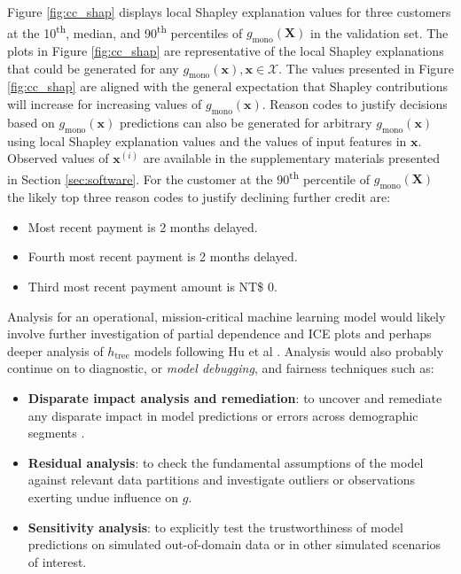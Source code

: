 \documentclass[sigconf, review]{acmart}
\begin{document}
Figure \ref{fig:cc_shap} displays local Shapley explanation values for three customers at the 10\textsuperscript{th}, median, and 90\textsuperscript{th} percentiles of $g_{\text{mono}}(\mathbf{X})$ in the validation set. The plots in Figure \ref{fig:cc_shap} are representative of the local Shapley explanations that could be generated for any $g_{\text{mono}}(\mathbf{x}), \mathbf{x} \in \mathcal{X}$. The values presented in Figure \ref{fig:cc_shap} are aligned with the general expectation that Shapley contributions will increase for increasing values of $g_{\text{mono}}(\mathbf{x})$. Reason codes to justify decisions based on $g_{\text{mono}}(\mathbf{x})$ predictions can also be generated for arbitrary $g_{\text{mono}}(\mathbf{x})$ using local Shapley explanation values and the values of input features in $\mathbf{x}$. 
Observed values of $\mathbf{x}^{(i)}$ are available in the supplementary materials presented in Section \ref{sec:software}. For the customer at the 90\textsuperscript{th} percentile of $g_{\text{mono}}(\mathbf{X})$ the likely top three reason codes to justify declining further credit are:

\begin{itemize}

\item Most recent payment is 2 months delayed.
\item Fourth most recent payment is 2 months delayed.
\item Third most recent payment amount is NT\$ 0.

\end{itemize} 

Analysis for an operational, mission-critical machine learning model would likely involve further investigation of partial dependence and ICE plots and perhaps deeper analysis of $h_{\text{tree}}$ models following Hu et al \cite{lime-sup}. Analysis would also probably continue on to diagnostic, or \textit{model debugging}, and fairness techniques such as:

\begin{itemize}

\item \textbf{Disparate impact analysis and remediation}: to uncover and remediate any disparate impact in model predictions or errors across demographic segments \cite{feldman2015certifying}.
\item \textbf{Residual analysis}: to check the fundamental assumptions of the model against relevant data partitions and investigate outliers or observations exerting undue influence on $g$. 
\item \textbf{Sensitivity analysis}: to explicitly test the trustworthiness of model predictions on simulated out-of-domain data or in other simulated scenarios of interest.  

\end{itemize} 
\end{document}
